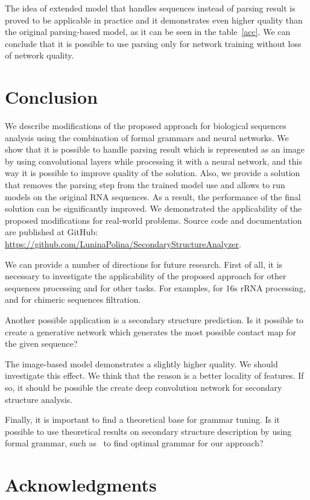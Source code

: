 \documentclass[12pt,a4paper]{cibb}
\begin{document}
The idea of extended model that handles sequences instead of parsing result is proved to be applicable in practice and it demonstrates even higher quality than the original parsing-based model, as it can be seen in the table~\ref{acc}.
We can conclude that it is possible to use parsing only for network training without loss of network quality.

\section{\bf Conclusion}

We describe modifications of the proposed approach for biological sequences analysis using the combination of formal grammars and neural networks.
We show that it is possible to handle parsing result which is represented as an image by using convolutional layers while processing it with a neural network, and this way it is possible to improve quality of the solution.
Also, we provide a solution that removes the parsing step from the trained model use and allows to run models on the original RNA sequences.
As a result, the performance of the final solution can be significantly improved.
We demonstrated the applicability of the proposed modifications for real-world problems.
Source code and documentation are published at GitHub: \url{https://github.com/LuninaPolina/SecondaryStructureAnalyzer}.

We can provide a number of directions for future research.
First of all, it is necessary to investigate the applicability of the proposed approach for other sequences processing and for other tasks.
For examples, for 16s rRNA processing, and for chimeric sequences filtration.

Another possible application is a secondary structure prediction.
Is it possible to create a generative network which generates the most possible contact map for the given sequence?

The image-based model demonstrates a slightly higher quality.
We should investigate this effect.
We think that the reason is a better locality of features.
If so, it should be possible the create deep convolution network for secondary structure analysis.

Finally, it is important to find a theoretical base for grammar tuning. Is it possible to use theoretical results on secondary structure description by using formal grammar, such as~\cite{MQbioinformatics19} to find optimal grammar for our approach?


\section*{\bf Acknowledgments}
\end{document}

